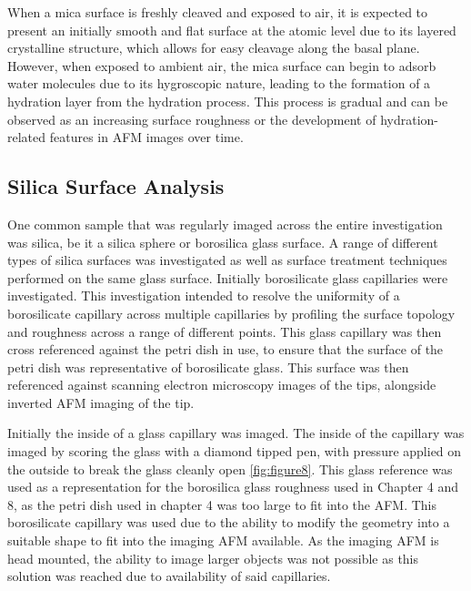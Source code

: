 When a mica surface is freshly cleaved and exposed to air, it is expected to present an initially smooth and flat surface at the atomic level due to its layered crystalline structure, which allows for easy cleavage along the basal plane. However, when exposed to ambient air, the mica surface can begin to adsorb water molecules due to its hygroscopic nature, leading to the formation of a hydration layer from the hydration process. This process is gradual and can be observed as an increasing surface roughness or the development of hydration-related features in AFM images over time. \cite{MicaSurf, MicaHgryo, Koishi2022WaterAdsorption}

\subsection{Silica Surface Analysis}

 One common sample that was regularly imaged across the entire investigation was silica, be it a silica sphere or borosilica glass surface. A range of different types of silica surfaces was investigated as well as surface treatment techniques performed on the same glass surface. Initially borosilicate glass capillaries were investigated. This investigation intended to resolve the uniformity of a borosilicate capillary across multiple capillaries by profiling the surface topology and roughness across a range of different points. This glass capillary was then cross referenced against the petri dish in use, to ensure that the surface of the petri dish was representative of borosilicate glass. This surface was then referenced against scanning electron microscopy images of the tips, alongside inverted AFM imaging of the tip. 

Initially the inside of a glass capillary was imaged. The inside of the capillary was imaged by scoring the glass with a diamond tipped pen, with pressure applied on the outside to break the glass cleanly open \ref{fig:figure8}. This glass reference was used as a representation for the borosilica glass roughness used in Chapter 4 and 8, as the petri dish used in chapter 4 was too large to fit into the AFM. This borosilicate capillary was used due to the ability to modify the geometry into a suitable shape to fit into the imaging AFM available. As the imaging AFM is head mounted, the ability to image larger objects was not possible as this solution was reached due to availability of said capillaries.

